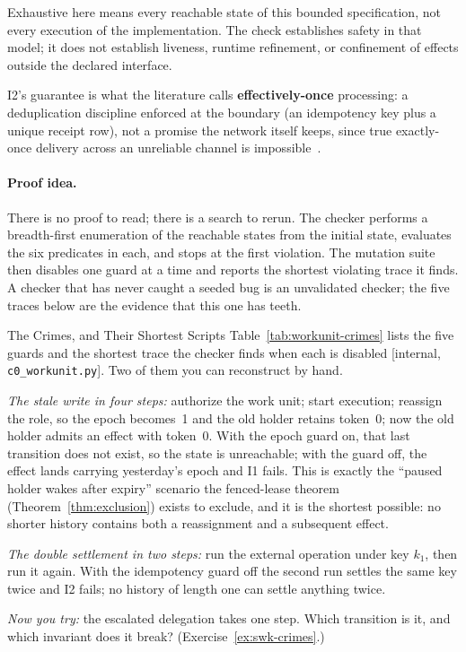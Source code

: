 \documentclass[11pt,a4paper]{article}
\theoremstyle{definition}
\theoremstyle{remark}
\begin{document}
Exhaustive here means every reachable state of this bounded specification,
not every execution of the implementation. The check establishes safety in
that model; it does not establish liveness, runtime refinement, or confinement
of effects outside the declared interface.

I2's guarantee is what the literature calls \textbf{effectively-once} processing: a
deduplication discipline enforced at the boundary (an idempotency key plus a unique
receipt row), not a promise the network itself keeps, since true exactly-once delivery
across an unreliable channel is impossible~.

\paragraph{Proof idea.}
There is no proof to read; there is a search to rerun. The checker performs a breadth-first
enumeration of the reachable states from the initial state, evaluates the six predicates in
each, and stops at the first violation. The mutation suite then disables one guard at a
time and reports the shortest violating trace it finds. A checker that has never caught a
seeded bug is an unvalidated checker; the five traces below are the evidence that this one
has teeth.

\begin{pdexample}{The Crimes, and Their Shortest Scripts}
\setlength{\parskip}{4pt plus 1pt}
Table~\ref{tab:workunit-crimes} lists the five guards and the shortest trace the checker
finds when each is disabled [internal, \texttt{c0\_workunit.py}]. Two of them you can
reconstruct by hand.

\emph{The stale write in four steps:} authorize the work unit; start
execution; reassign the role, so the epoch becomes~1 and the old holder retains token~0;
now the old holder admits an effect with token~0. With the epoch guard on, that last
transition does not exist, so the state is unreachable; with the guard off, the effect
lands carrying yesterday's epoch and I1 fails. This is exactly the ``paused holder wakes
after expiry'' scenario the fenced-lease theorem (Theorem~\ref{thm:exclusion}) exists to
exclude, and it is the shortest possible: no shorter history contains both a reassignment
and a subsequent effect.

\emph{The double settlement in two steps:} run the external
operation under key $k_1$, then run it again. With the idempotency guard off the second run
settles the same key twice and I2 fails; no history of length one can settle anything twice.

\emph{Now you try:} the escalated delegation takes one step. Which transition is it, and
which invariant does it break? (Exercise~\ref{ex:swk-crimes}.)
\end{pdexample}
\end{document}
